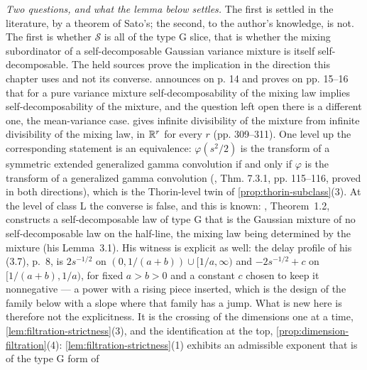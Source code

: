 \begin{remark}
\emph{Two questions, and what the lemma below settles.} The first is settled in the literature, by a theorem of Sato's; the second, to the author's knowledge, is not. The first is whether $\mathcal{S}$ is all of the type G slice, that is whether the
mixing subordinator of a self-decomposable Gaussian variance mixture is itself
self-decomposable. The held sources prove the implication in the direction this chapter uses
and not its converse.  announces on p. 14 and proves on pp. 15--16
that for a pure variance mixture self-decomposability of the mixing law implies
self-decomposability of the mixture, and the question left open there is a different one, the
mean-variance case.  gives infinite divisibility of the
mixture from infinite divisibility of the mixing law, in $\mathbb{R}^r$ for every $r$ (pp. 309--311).
One level up the corresponding statement is an equivalence: $\varphi(s^2/2)$ is the transform
of a symmetric extended generalized gamma convolution if and only if $\varphi$ is the transform
of a generalized gamma convolution (, Thm. 7.3.1, pp. 115--116,
proved in both directions), which is the Thorin-level twin of \ref{prop:thorin-subclass}(3). At the level of class L the converse is false, and this is known: , Theorem~1.2, constructs a self-decomposable law of type G that is the Gaussian mixture of no self-decomposable law on the half-line, the mixing law being determined by the mixture (his Lemma~3.1).
His witness is explicit as well: the delay profile of his (3.7), p.~8, is $2s^{-1/2}$ on
$(0,1/(a+b)) \cup [1/a,\infty)$ and $-2s^{-1/2} + c$ on $[1/(a+b),1/a)$, for fixed $a > b > 0$ and
a constant $c$ chosen to keep it nonnegative --- a power with a rising piece inserted, which is
the design of the family below with a slope where that family has a jump. What is new here is
therefore not the explicitness. It is the crossing of the dimensions one at a time,
\ref{lem:filtration-strictness}(3), and the identification at the top,
\ref{prop:dimension-filtration}(4):
\ref{lem:filtration-strictness}(1) exhibits an admissible exponent that is of the type G form of

\end{remark}
